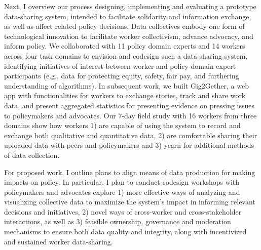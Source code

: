 Next, I overview our process designing, implementing and evaluating a prototype data-sharing system, intended to facilitate solidarity and information exchange, as well as affect related policy decisions. Data collectives embody one form of technological innovation to facilitate worker collectivism, advance advocacy, and inform policy. We collaborated with 11 policy domain experts and 14 workers across four task domains to envision and codesign such a data sharing system, identifying initiatives of interest between worker and policy domain expert participants (e.g., data for protecting equity, safety, fair pay, and furthering understanding of algorithms). In subsequent work, we built Gig2Gether, a web app with functionalities for workers to exchange stories, track and share work data, and present aggregated statistics for presenting evidence on pressing issues to policymakers and advocates. Our 7-day field study with 16 workers from three domains show how workers 1) are capable of using the system to record and exchange both qualitative and quantitative data, 2) are comfortable sharing their uploaded data with peers and policymakers and 3) yearn for additional methods of data collection.

For proposed work, I outline plans to align means of data production for making impacts on policy. In particular, I plan to conduct codesign workshops with policymakers and advocates explore 1) more effective ways of analyzing and visualizing collective data to maximize the system's impact in informing relevant decisions and initiatives, 2) novel ways of cross-worker and cross-stakeholder interactions, as well as 3) feasible ownership, governance and moderation mechanisms to ensure both data quality and integrity, along with incentivized and sustained worker data-sharing.

\vfill

\endgroup			

\vfill